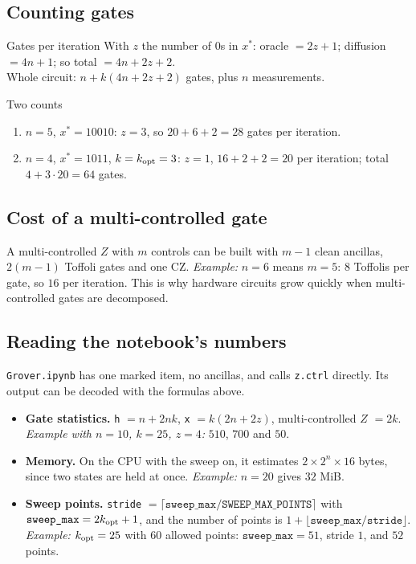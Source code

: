 \documentclass[11pt,a4paper,openany]{book}
\newcounter{wex}[section]
\newenvironment{steps}{\begin{enumerate}[label=\textbf{Step \arabic*.}, leftmargin=4.2em, itemsep=2pt]}{\end{enumerate}}
\newcommand{\kopt}{k_{\rm opt}}
\newcommand{\xs}{x^\ast}
\begin{document}
\subsection{Counting gates}
\begin{keyres}{Gates per iteration}
With $z$ the number of $0$s in $\xs$: oracle $= 2z + 1$; diffusion $= 4n + 1$; so \quad total $= 4n + 2z + 2$. \\
Whole circuit: $n + k(4n + 2z + 2)$ gates, plus $n$ measurements.
\end{keyres}
\begin{wexample}{Two counts}
\begin{steps}
\item $n = 5$, $\xs = 10010$: $z = 3$, so $20 + 6 + 2 = 28$ gates per iteration.
\item $n = 4$, $\xs = 1011$, $k = \kopt = 3$: $z = 1$, $16 + 2 + 2 = 20$ per iteration; total $4 + 3\cdot20 = 64$ gates.
\end{steps}
\end{wexample}

\subsection{Cost of a multi-controlled gate}
A multi-controlled $Z$ with $m$ controls can be built with $m - 1$ clean ancillas, $2(m - 1)$ Toffoli gates and one CZ. \emph{Example:} $n = 6$ means $m = 5$: $8$ Toffolis per gate, so $16$ per iteration. This is why hardware circuits grow quickly when multi-controlled gates are decomposed.

\subsection{Reading the notebook's numbers}
\texttt{Grover.ipynb} has one marked item, no ancillas, and calls \texttt{z.ctrl} directly. Its output can be decoded with the formulas above.
\begin{itemize}[itemsep=2pt]
\item \textbf{Gate statistics.} \texttt{h} $= n + 2nk$, \texttt{x} $= k(2n + 2z)$, multi-controlled $Z$ $= 2k$. \emph{Example with $n = 10$, $k = 25$, $z = 4$:} $510$, $700$ and $50$.
\item \textbf{Memory.} On the CPU with the sweep on, it estimates $2\times2^n\times16$ bytes, since two states are held at once. \emph{Example:} $n = 20$ gives $32$ MiB.
\item \textbf{Sweep points.} \texttt{stride} $= \lceil\texttt{sweep\_max}/\texttt{SWEEP\_MAX\_POINTS}\rceil$ with $\texttt{sweep\_max} = 2\kopt + 1$, and the number of points is $1 + \lfloor\texttt{sweep\_max}/\texttt{stride}\rfloor$. \emph{Example:} $\kopt = 25$ with $60$ allowed points: $\texttt{sweep\_max} = 51$, stride $1$, and $52$ points.
\end{itemize}
\end{document}
